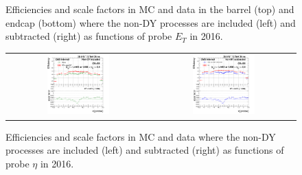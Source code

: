 \begin{figure}[htp]
\begin{center}
\begin{tabular}{cc}
    \end{tabular}
    \caption{Efficiencies and scale factors in MC and data in the barrel (top) and endcap (bottom) where the non-DY processes are included (left) and subtracted (right) as functions of probe $E_T$ in 2016.}
    \label{fig:eff_SS_nominal_ET_2016}
  \end{center}
\end{figure}

\begin{figure}[htp]
  \begin{center}
    \begin{tabular}{cc}
      \includegraphics[width=0.45\textwidth]{figures/Zprime/2016/ScaleFactor/SameSign/nominal/g_compare_cut_eta_Barrel+Endcap_ea_ta_inc_AS_nominal_PUW.png} &
      \includegraphics[width=0.45\textwidth]{figures/Zprime/2016/ScaleFactor/SameSign/nominal/g_compare_cut_eta_Barrel+Endcap_ea_ta_exc_AS_nominal_PUW.png} \\
    \end{tabular}
    \caption{Efficiencies and scale factors in MC and data where the non-DY processes are included (left) and subtracted (right) as functions of probe $\eta$ in 2016.}
    \label{fig:eff_SS_nominal_eta_2016}
  \end{center}
\end{figure}

